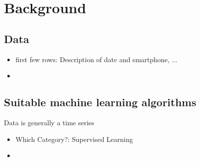 \chapter{Background}\label{sec:data}

\section{Data}
    \begin{itemize}
        \item first few rows: Description of date and smartphone, \(\dots\)
        \item 
    \end{itemize}

\section{Suitable machine learning algorithms}
Data is generally a time series
    \begin{itemize}
        \item Which Category?: Supervised Learning
        \item 
    \end{itemize}

